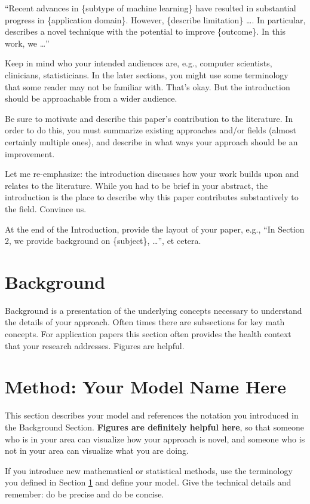 \documentclass[twoside,11pt]{article}
\begin{document}
``Recent advances in \{subtype of machine learning\} \citep{cite1} have resulted in substantial progress in \{application domain\}. However, \{describe limitation\} \dots.
In particular, \citet{cite2} describes a novel technique with the potential to improve \{outcome\}.
In this work, we \dots''

Keep in mind who your intended audiences are, e.g., computer scientists, clinicians, statisticians.
In the later sections, you might use some terminology that some reader may not be familiar with.
That's okay. But the introduction should be approachable from a wider audience.

Be sure to motivate and describe this paper's contribution to the literature.
In order to do this, you must summarize existing approaches and/or fields (almost certainly multiple ones),
and describe in what ways your approach should be an improvement. 

Let me re-emphasize: the introduction discusses how your work builds upon and relates to the literature. While you had to be brief in your abstract, the introduction is the place to describe why this paper contributes substantively to the field. Convince us.

At the end of the Introduction, provide the layout of your paper, e.g., ``In Section 2, we provide background on \{subject\}, \dots'',  et cetera.

\section{Background} \label{background}
Background is a presentation of the underlying concepts necessary to understand the details of your approach. Often times there are subsections for key math concepts. For application papers this section often provides the health context that your research addresses. Figures are helpful.

\section{Method: Your Model Name Here} \label{model}
This section describes your model and references the notation you introduced in the Background Section. \textbf{Figures are definitely helpful here}, so that someone who is in your area can visualize how your approach is novel, and someone who is not in your area can visualize what you are doing.

If you introduce new mathematical or statistical methods, use the terminology you defined in Section \ref{background} and define your model. Give the technical details and remember: do be precise and do be concise.
\end{document}
